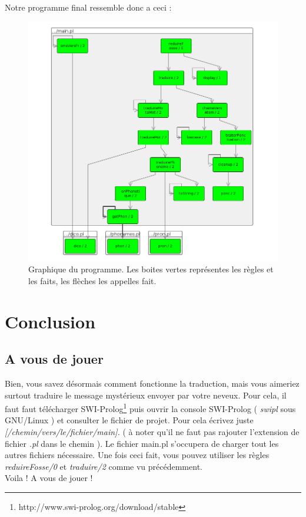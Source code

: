 \documentclass[11pt]{report}
\begin{document}
	Notre programme final ressemble donc a ceci :\\
	\begin{figure}[htp]
	\centering
	\includegraphics[scale=0.60]{mainpl.png}
	\caption{Graphique du programme. Les boites vertes représentes les règles et les faits, les flèches les appelles fait.}
	\end{figure}
 
\chapter{Conclusion}
	\section{A vous de jouer}
	Bien, vous savez désormais comment fonctionne la traduction, mais vous aimeriez surtout traduire le message mystérieux envoyer par votre neveux. Pour cela, il faut faut télécharger SWI-Prolog\footnote{http://www.swi-prolog.org/download/stable} puis ouvrir la console SWI-Prolog ( {\em swipl} sous GNU/Linux ) et consulter le fichier de projet. Pour cela écrivez juste {\em [/chemin/vers/le/fichier/main].} ( à noter qu'il ne faut pas rajouter l'extension de fichier {\em .pl} dans le chemin ). Le fichier main.pl s'occupera de charger tout les autres fichiers nécessaire. Une fois ceci fait, vous pouvez utiliser les règles {\em reduireFosse/0} et {\em traduire/2} comme vu précédemment.\\
	Voila ! A vous de jouer !
	
\end{document}
